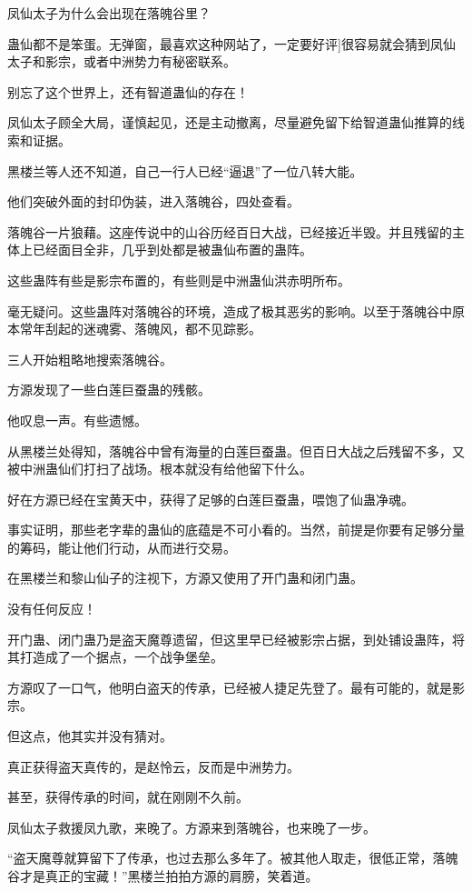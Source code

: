 \begin{this_body}
凤仙太子为什么会出现在落魄谷里？

蛊仙都不是笨蛋。无弹窗，最喜欢这种网站了，一定要好评]很容易就会猜到凤仙太子和影宗，或者中洲势力有秘密联系。

别忘了这个世界上，还有智道蛊仙的存在！

凤仙太子顾全大局，谨慎起见，还是主动撤离，尽量避免留下给智道蛊仙推算的线索和证据。

黑楼兰等人还不知道，自己一行人已经“逼退”了一位八转大能。

他们突破外面的封印伪装，进入落魄谷，四处查看。

落魄谷一片狼藉。这座传说中的山谷历经百日大战，已经接近半毁。并且残留的主体上已经面目全非，几乎到处都是被蛊仙布置的蛊阵。

这些蛊阵有些是影宗布置的，有些则是中洲蛊仙洪赤明所布。

毫无疑问。这些蛊阵对落魄谷的环境，造成了极其恶劣的影响。以至于落魄谷中原本常年刮起的迷魂雾、落魄风，都不见踪影。

三人开始粗略地搜索落魄谷。

方源发现了一些白莲巨蚕蛊的残骸。

他叹息一声。有些遗憾。

从黑楼兰处得知，落魄谷中曾有海量的白莲巨蚕蛊。但百日大战之后残留不多，又被中洲蛊仙们打扫了战场。根本就没有给他留下什么。

好在方源已经在宝黄天中，获得了足够的白莲巨蚕蛊，喂饱了仙蛊净魂。

事实证明，那些老字辈的蛊仙的底蕴是不可小看的。当然，前提是你要有足够分量的筹码，能让他们行动，从而进行交易。

在黑楼兰和黎山仙子的注视下，方源又使用了开门蛊和闭门蛊。

没有任何反应！

开门蛊、闭门蛊乃是盗天魔尊遗留，但这里早已经被影宗占据，到处铺设蛊阵，将其打造成了一个据点，一个战争堡垒。

方源叹了一口气，他明白盗天的传承，已经被人捷足先登了。最有可能的，就是影宗。

但这点，他其实并没有猜对。

真正获得盗天真传的，是赵怜云，反而是中洲势力。

甚至，获得传承的时间，就在刚刚不久前。

凤仙太子救援凤九歌，来晚了。方源来到落魄谷，也来晚了一步。

“盗天魔尊就算留下了传承，也过去那么多年了。被其他人取走，很低正常，落魄谷才是真正的宝藏！”黑楼兰拍拍方源的肩膀，笑着道。


\end{this_body}
